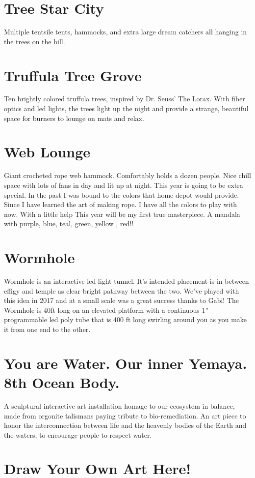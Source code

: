 \section*{Tree Star City}
Multiple tentsile tents, hammocks, and extra large dream catchers all hanging in the trees on the hill.


\section*{Truffula Tree Grove}
Ten brightly colored truffula trees, inspired by Dr. Seuss' The Lorax. With fiber optics and led lights, the trees light up the night and provide a strange, beautiful space for burners to lounge on mats and relax. 

\section*{Web Lounge}
Giant crocheted rope web hammock. Comfortably holds a dozen people. Nice chill space with lots of fans in day and lit up at night.
This year is going to be extra special. In the past I was bound to the colors that home depot would provide. Since I have learned the art of making rope. I have all the colors to play with now. With a little help This year will be my first true masterpiece. A mandala with purple, blue, teal, green, yellow , red!!


\section*{Wormhole}
Wormhole is an interactive led light tunnel. It’s intended placement is in between effigy and temple as clear bright pathway between the two. We’ve played with this idea in 2017 and at a small scale was a great success thanks to Gabi! The Wormhole is 40ft long on an elevated platform with a continuous 1” programmable led poly tube that is 400 ft long swirling around you as you make it from one end to the other.


\section*{You are Water. Our inner Yemaya. 8th Ocean Body.}
A sculptural interactive art installation homage to our ecosystem in balance, made
from orgonite talismans paying tribute to bio-remediation. An art piece to honor the interconnection between life and the heavenly bodies of the Earth and the waters, to encourage people to respect water.

\newpage
\section*{Draw Your Own Art Here!}